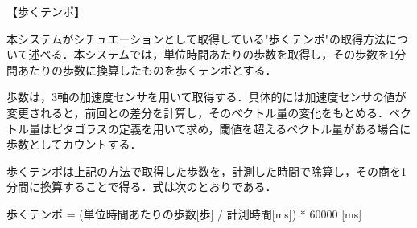 【歩くテンポ】
\par
本システムがシチュエーションとして取得している"歩くテンポ"の取得方法について述べる．本システムでは，単位時間あたりの歩数を取得し，その歩数を1分間あたりの歩数に換算したものを歩くテンポとする．
\par
歩数は，3軸の加速度センサを用いて取得する．具体的には加速度センサの値が変更されると，前回との差分を計算し，そのベクトル量の変化をもとめる．ベクトル量はピタゴラスの定義を用いて求め，閾値を超えるベクトル量がある場合に歩数としてカウントする．
\par
歩くテンポは上記の方法で取得した歩数を，計測した時間で除算し，その商を1分間に換算することで得る．式は次のとおりである．
\par
歩くテンポ = (単位時間あたりの歩数[歩] / 計測時間[ms]) * 60000 [ms]
